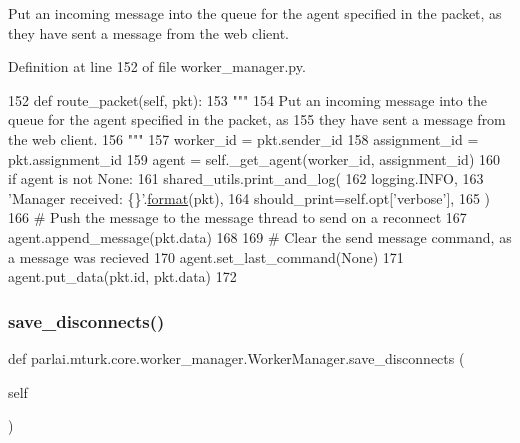 \begin{DoxyVerb}Put an incoming message into the queue for the agent specified in the packet, as
they have sent a message from the web client.
\end{DoxyVerb}
 

Definition at line 152 of file worker\+\_\+manager.\+py.


\begin{DoxyCode}
152     \textcolor{keyword}{def }route\_packet(self, pkt):
153         \textcolor{stringliteral}{"""}
154 \textcolor{stringliteral}{        Put an incoming message into the queue for the agent specified in the packet, as}
155 \textcolor{stringliteral}{        they have sent a message from the web client.}
156 \textcolor{stringliteral}{        """}
157         worker\_id = pkt.sender\_id
158         assignment\_id = pkt.assignment\_id
159         agent = self.\_get\_agent(worker\_id, assignment\_id)
160         \textcolor{keywordflow}{if} agent \textcolor{keywordflow}{is} \textcolor{keywordflow}{not} \textcolor{keywordtype}{None}:
161             shared\_utils.print\_and\_log(
162                 logging.INFO,
163                 \textcolor{stringliteral}{'Manager received: \{\}'}.\hyperlink{namespaceparlai_1_1chat__service_1_1services_1_1messenger_1_1shared__utils_a32e2e2022b824fbaf80c747160b52a76}{format}(pkt),
164                 should\_print=self.opt[\textcolor{stringliteral}{'verbose'}],
165             )
166             \textcolor{comment}{# Push the message to the message thread to send on a reconnect}
167             agent.append\_message(pkt.data)
168 
169             \textcolor{comment}{# Clear the send message command, as a message was recieved}
170             agent.set\_last\_command(\textcolor{keywordtype}{None})
171             agent.put\_data(pkt.id, pkt.data)
172 
\end{DoxyCode}
\mbox{\label{classparlai_1_1mturk_1_1core_1_1worker__manager_1_1WorkerManager_ad5ea6d1d764743de25c71d027d6f981c}} 
\subsubsection{\texorpdfstring{save\+\_\+disconnects()}{save\_disconnects()}}
{\footnotesize\ttfamily def parlai.\+mturk.\+core.\+worker\+\_\+manager.\+Worker\+Manager.\+save\+\_\+disconnects (\begin{DoxyParamCaption}\item[{}]{self }\end{DoxyParamCaption})}

